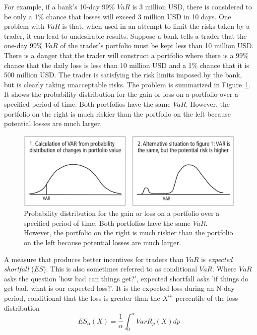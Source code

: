 For example, if a bank's 10-day 99\% $VaR$ is 3 million USD, there is considered to be only a 1\% chance that losses will exceed 3 million USD in 10 days. One problem with $VaR$ is that, when used in an attempt to limit the risks taken by a trader, it can lead to undesirable results. Suppose a bank tells a trader that the one-day 99\% $VaR$ of the trader's portfolio must be kept less than 10 million USD. There is a danger that the trader will construct a portfolio where there is a 99\% chance that the daily loss is less than 10 million USD and a 1\% chance that it is 500 million USD. The trader is satisfying the risk limits imposed by the bank, but is clearly taking unacceptable risks. 
The problem is summarized in Figure~\ref{fig:var_vs_badvar}. It shows the probability distribution for the gain or loss on a portfolio over a specified period of time. Both portfolios have the same $VaR$. However, the portfolio on the right is much riskier than the portfolio on the left because potential losses are much larger. 

\begin{figure}[htb]
\centering
\includegraphics[width=0.8\linewidth]{figures/var_badvar}
\caption{Probability distribution for the gain or loss on a portfolio over a specified period of time. Both portfolios have the same $VaR$. However, the portfolio on the right is much riskier than the portfolio on the left because potential losses are much larger.}
\label{fig:var_vs_badvar}
\end{figure}

A measure that produces better incentives for traders than $VaR$ is \emph{expected shortfall} ($ES$). This is also sometimes referred to as conditional $VaR$. Where $VaR$ asks the question 'how bad can things get?', expected shortfall asks 'if things do get bad, what is our expected loss?'. It is the expected loss during an N-day period, conditional that the loss is greater than the $X^{th}$ percentile of the loss distribution
\begin{equation}
ES_{\alpha}(X) = \frac{1}{\alpha}\int_0^\alpha VarR_p(X) dp
\label{eq:es}
\end{equation}

